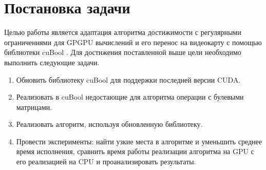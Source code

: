 
\section{Постановка задачи}
\label{sec:task}

Целью работы является адаптация алгоритма достижимости с регулярными ограничениями
для GPGPU вычислений и его перенос на видеокарту с помощью библиотеки cuBool \cite{CuBool}.
Для достижения поставленной выше цели необходимо выполнить следующие задачи.
\begin{enumerate}
    \item Обновить библиотеку cuBool для поддержки последней версии CUDA.
    \item Реализовать в cuBool недостающие для алгоритма операции с булевыми
          матрицами.
    \item Реализовать алгоритм, используя обновленную библиотеку.
    \item Провести эксперименты: найти узкие места в алгоритме и уменьшить среднее
          время исполнения, сравнить время работы
          реализации алгоритма на GPU с его реализацией на CPU и проанализировать результаты.
\end{enumerate}
